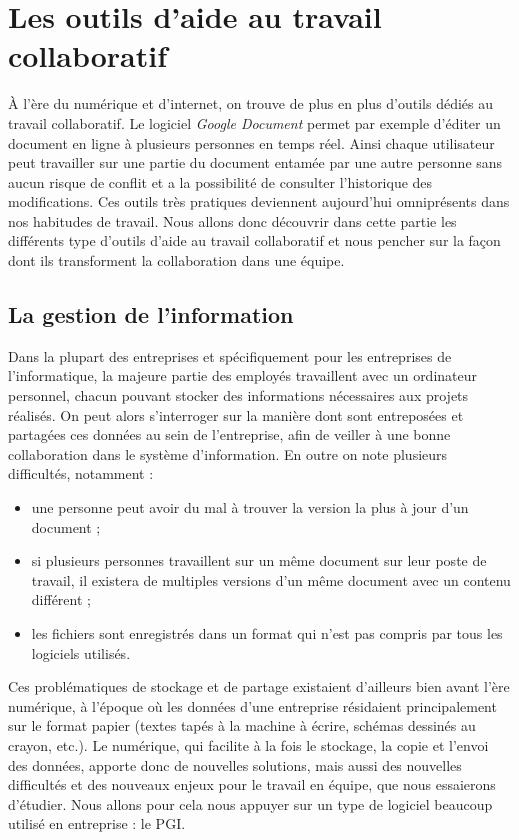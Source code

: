 \chapter{Les outils d'aide au travail collaboratif}

À l'ère du numérique et d'internet, on trouve de plus en plus d'outils dédiés au travail collaboratif. Le logiciel \textit{Google Document} permet par exemple d'éditer un document en ligne à plusieurs personnes en temps réel. Ainsi chaque utilisateur peut travailler sur une partie du document entamée par une autre personne sans aucun risque de conflit et a la possibilité de consulter l'historique des modifications. Ces outils très pratiques deviennent aujourd'hui omniprésents dans nos habitudes de travail. Nous allons donc découvrir dans cette partie les différents type d'outils d'aide au travail collaboratif et nous pencher sur la façon dont ils transforment la collaboration dans une équipe.

\section{La gestion de l'information}

Dans la plupart des entreprises et spécifiquement pour les entreprises de l'informatique, la majeure partie des employés travaillent avec un ordinateur personnel, chacun pouvant stocker des informations nécessaires aux projets réalisés. On peut alors s'interroger sur la manière dont sont entreposées et partagées ces données au sein de l'entreprise, afin de veiller à une bonne collaboration dans le système d'information. En outre on note plusieurs difficultés, notamment :

\begin{itemize}
\item une personne peut avoir du mal à trouver la version la plus à jour d'un document ;
\item si plusieurs personnes travaillent sur un même document sur leur poste de travail, il existera de multiples versions d'un même document avec un contenu différent ;
\item les fichiers sont enregistrés dans un format qui n'est pas compris par tous les logiciels utilisés.
\end{itemize}

Ces problématiques de stockage et de partage existaient d'ailleurs bien avant l'ère numérique, à l'époque où les données d'une entreprise résidaient principalement sur le format papier (textes tapés à la machine à écrire, schémas dessinés au crayon, etc.). Le numérique, qui facilite à la fois le stockage, la copie et l'envoi des données, apporte donc de nouvelles solutions, mais aussi des nouvelles difficultés et des nouveaux enjeux pour le travail en équipe, que nous essaierons d'étudier. Nous allons pour cela nous appuyer sur un type de logiciel beaucoup utilisé en entreprise : le PGI.

